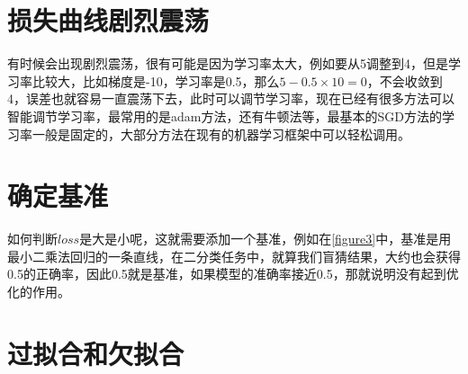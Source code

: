 \documentclass[a5paper, 11pt]{ctexbook}
\begin{document}
\section{损失曲线剧烈震荡}
有时候会出现剧烈震荡，很有可能是因为学习率太大，例如要从5调整到4，但是学习率比较大，比如梯度是-10，学习率是0.5，那么$5-0.5×10=0$，不会收敛到4，误差也就容易一直震荡下去，此时可以调节学习率，现在已经有很多方法可以智能调节学习率，最常用的是adam方法，还有牛顿法等，最基本的SGD方法的学习率一般是固定的，大部分方法在现有的机器学习框架中可以轻松调用。

\section{确定基准}\label{确定基准}

\begin{sloppypar}
如何判断$loss$是大是小呢，这就需要添加一个基准，例如在\ref{figure3}中，基准是用最小二乘法回归的一条直线，在二分类任务中，就算我们盲猜结果，大约也会获得0.5的正确率，因此0.5就是基准，如果模型的准确率接近0.5，那就说明没有起到优化的作用。
\end{sloppypar}


\section{过拟合和欠拟合}
\end{document}
